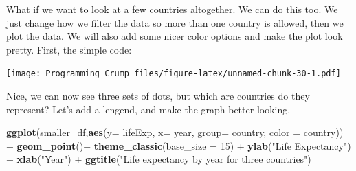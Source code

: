 \documentclass[]{book}
\newenvironment{Shaded}{\begin{snugshade}}{\end{snugshade}}
\newcommand{\KeywordTok}[1]{\textcolor[rgb]{0.13,0.29,0.53}{\textbf{{#1}}}}
\newcommand{\DataTypeTok}[1]{\textcolor[rgb]{0.13,0.29,0.53}{{#1}}}
\newcommand{\DecValTok}[1]{\textcolor[rgb]{0.00,0.00,0.81}{{#1}}}
\newcommand{\StringTok}[1]{\textcolor[rgb]{0.31,0.60,0.02}{{#1}}}
\newcommand{\CommentTok}[1]{\textcolor[rgb]{0.56,0.35,0.01}{\textit{{#1}}}}
\newcommand{\OtherTok}[1]{\textcolor[rgb]{0.56,0.35,0.01}{{#1}}}
\newcommand{\NormalTok}[1]{{#1}}
\theoremstyle{definition}
\theoremstyle{definition}
\theoremstyle{definition}
\theoremstyle{remark}
\begin{document}
What if we want to look at a few countries altogether. We can do this
too. We just change how we filter the data so more than one country is
allowed, then we plot the data. We will also add some nicer color
options and make the plot look pretty. First, the simple code:

\begin{Shaded}
\end{Shaded}

\texttt{[image: Programming\_Crump\_files/figure-latex/unnamed-chunk-30-1.pdf]}

Nice, we can now see three sets of dots, but which are countries do they
represent? Let's add a lengend, and make the graph better looking.

\begin{Shaded}
\begin{Highlighting}[]
\KeywordTok{ggplot}\NormalTok{(smaller_df,}\KeywordTok{aes}\NormalTok{(}\DataTypeTok{y=} \NormalTok{lifeExp, }\DataTypeTok{x=} \NormalTok{year, }
                      \DataTypeTok{group=} \NormalTok{country, }\DataTypeTok{color =} \NormalTok{country)) +}
\StringTok{  }\KeywordTok{geom_point}\NormalTok{()+}\StringTok{ }
\StringTok{  }\KeywordTok{theme_classic}\NormalTok{(}\DataTypeTok{base_size =} \DecValTok{15}\NormalTok{) +}
\StringTok{  }\KeywordTok{ylab}\NormalTok{(}\StringTok{"Life Expectancy"}\NormalTok{) +}\StringTok{ }
\StringTok{  }\KeywordTok{xlab}\NormalTok{(}\StringTok{"Year"}\NormalTok{) +}
\StringTok{  }\KeywordTok{ggtitle}\NormalTok{(}\StringTok{"Life expectancy by year for three countries"}\NormalTok{)}
\end{Highlighting}
\end{Shaded}
\end{document}
